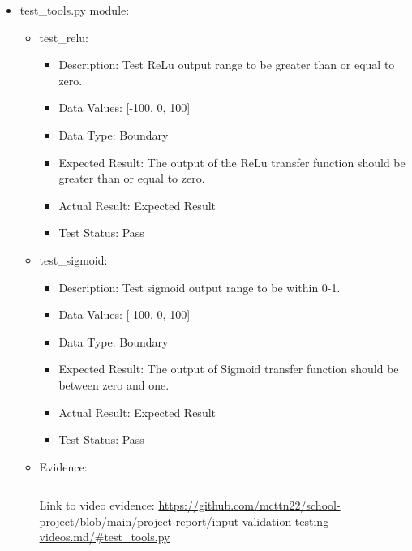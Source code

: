 \documentclass[./project-report/src/latex/project-report.tex]{subfiles}
\begin{document}
\begin{itemize}
\begin{itemize}
\begin{itemize}
				\end{itemize}
            \item test\_tools.py module:
				\begin{itemize}
					\item test\_relu:
					\begin{itemize}
						\item Description: Test ReLu output range to be greater than or equal to zero.
						\item Data Values: [-100, 0, 100]
						\item Data Type: Boundary
						\item Expected Result: The output of the ReLu transfer function should be greater than or equal to zero.
						\item Actual Result: Expected Result
						\item Test Status: Pass
					\end{itemize}
					\item test\_sigmoid:
					\begin{itemize}
						\item Description: Test sigmoid output range to be within 0-1.
						\item Data Values: [-100, 0, 100]
						\item Data Type: Boundary
						\item Expected Result: The output of Sigmoid transfer function should be between zero and one.
						\item Actual Result: Expected Result
						\item Test Status: Pass
					\end{itemize}
					\item Evidence:
                		\inputminted{python}{./school_project/test/models/cpu/utils/test_tools.py}
						\begin{figure}[h!]
						\centering
						\end{figure}
	
						Link to video evidence: \url{https://github.com/mcttn22/school-project/blob/main/project-report/input-validation-testing-videos.md/#test_tools.py}
				\end{itemize}
        \end{itemize}
\end{itemize}
\end{document}
